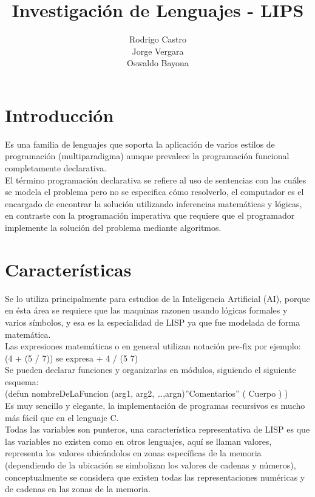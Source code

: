 \documentclass[11pt]{article} %
\title{Investigación de Lenguajes - LIPS}
\author{Rodrigo Castro\\Jorge Vergara\\Oswaldo Bayona}
\begin{document}
\maketitle

\section{Introducción}

Es una familia de lenguajes que soporta la aplicación de varios estilos de programación 
(multiparadigma) aunque prevalece la programación funcional completamente declarativa.\\

El término programación declarativa se refiere al uso de sentencias con las cuáles se modela el
problema pero no se especifica cómo resolverlo,  el computador es el encargado de encontrar 
la solución utilizando inferencias matemáticas y lógicas, en contraste con la programación
imperativa que requiere que el programador implemente la  solución del problema mediante
algoritmos.\\

\section{Características}


Se lo utiliza principalmente para estudios de la Inteligencia Artificial (AI), porque en ésta área
se requiere que las maquinas razonen usando lógicas formales y varios símbolos, y esa es la especialidad de LISP
ya que fue modelada de forma matemática.\\


Las expresiones matemáticas o en general utilizan notación pre-fix por ejemplo:\\
(4 + (5 / 7))  se expresa + 4 / (5  7)\\
Se pueden declarar funciones y organizarlas en módulos, siguiendo el siguiente esquema:\\
	(defun nombreDeLaFuncion (arg1, arg2, …,argn)”Comentarios” (  Cuerpo ) )\\
	
Es muy sencillo y elegante, la implementación de programas recursivos es mucho más fácil que en el lenguaje C.\\

Todas las variables son punteros, una característica representativa de LISP es que las variables 
no existen como en otros lenguajes, aquí se llaman valores, representa los valores ubicándolos 
en zonas específicas de la memoria (dependiendo de la ubicación se simbolizan los valores
de cadenas y números), conceptualmente se considera que existen todas las representaciones
numéricas y de cadenas en las zonas de la memoria.\\
\end{document}
